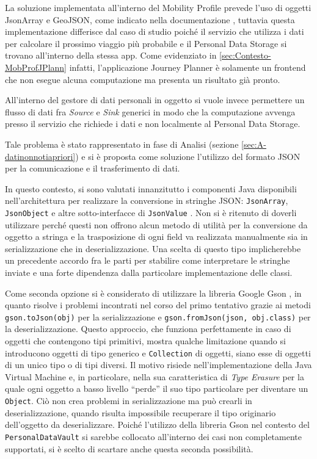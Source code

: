 La soluzione implementata all’interno del Mobility Profile prevede l’uso di oggetti JsonArray e GeoJSON, come indicato nella documentazione  \cite{githubmobilityprofilespecification}, tuttavia questa implementazione differisce dal caso di studio poich\'e il servizio che utilizza i dati per calcolare il prossimo viaggio pi\`u probabile e il Personal Data Storage si trovano all’interno della stessa app. Come evidenziato in \ref{sec:Contesto-MobProfJPlann} infatti, l’applicazione Journey Planner \`e solamente un frontend che non esegue alcuna computazione ma presenta un risultato gi\`a pronto.

All’interno del gestore di dati personali in oggetto si vuole invece permettere un flusso di dati fra \textit{Source} e \textit{Sink} generici in modo che la computazione avvenga presso il servizio che richiede i dati e non localmente al Personal Data Storage.

Tale problema \`e stato rappresentato in fase di Analisi (sezione \ref{sec:A-datinonnotiapriori}) e si \`e proposta come soluzione l’utilizzo del formato JSON per la comunicazione e il trasferimento di dati.

In questo contesto, si sono valutati innanzitutto i componenti Java disponibili nell’architettura per realizzare la conversione in stringhe JSON: \texttt{JsonArray}, \texttt{JsonObject} e altre sotto-interfacce di \texttt{JsonValue} \cite{java8api}. Non si \`e ritenuto di doverli utilizzare perch\'e questi non offrono alcun metodo di utilit\`a per la conversione da oggetto a stringa e la trasposizione di ogni field va realizzata manualmente sia in serializzazione che in deserializzazione. Una scelta di questo tipo implicherebbe un precedente accordo fra le parti per stabilire come interpretare le stringhe inviate e una forte dipendenza dalla particolare implementazione delle classi.

Come seconda opzione si \`e considerato di utilizzare la libreria Google Gson \cite{googlegson}, in quanto risolve i problemi incontrati nel corso del primo tentativo grazie ai metodi \texttt{gson.toJson(obj)} per la serializzazione e \texttt{gson.fromJson(json, obj.class)} per la deserializzazione. Questo approccio, che funziona perfettamente in caso di oggetti che contengono tipi primitivi, mostra qualche limitazione quando si introducono oggetti di tipo generico e \texttt{Collection} di oggetti, siano esse di oggetti di un unico tipo o di tipi diversi. Il motivo risiede nell’implementazione della Java Virtual Machine e, in particolare, nella sua caratteristica di \textit{Type Erasure} per la quale ogni oggetto a basso livello “perde” il suo tipo particolare per diventare un \texttt{Object}. Ci\`o non crea problemi in serializzazione ma pu\`o crearli in deserializzazione, quando risulta impossibile recuperare il tipo originario dell’oggetto da deserializzare. Poich\'e l’utilizzo della libreria Gson nel contesto del \texttt{PersonalDataVault} si sarebbe collocato all’interno dei casi non completamente supportati, si \`e scelto di scartare anche questa seconda possibilit\`a.

